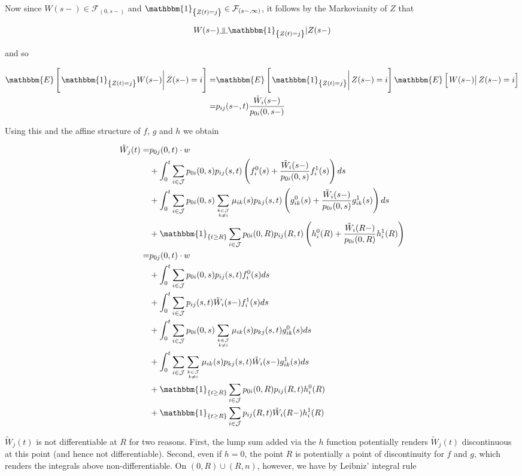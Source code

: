 \documentclass{article}
\newcommand{\indep}{\rotatebox[origin=c]{90}{$\models$}}
\newcommand{\1}[1]{\mathbbm{1}_{\left\lbrace #1 \right\rbrace}}
\newcommand{\econd}[2][def]{\mathbbm{E} \left[ \left. #1 \right| #2 \right]}
\theoremstyle{break}
\theoremstyle{remark}
\numberwithin{equation}{section}
\begin{document}
\begin{appendices}
Now since $W(s-) \in  \mathcal{F}_{\left( 0,s- \right)}$ and $\1{Z(t)=j} \in \mathcal{F}_{\left( s-,\infty \right)}$, it follows by the Markovianity of $Z$ that

\begin{align*}
	W(s-) \indep \1{Z(t)=j} | Z(s-)
\end{align*}

and so

\begin{align*}
	\econd[\1{Z(t)=j}W(s-)]{Z(s-)=i} =& \econd[\1{Z(t)=j}]{Z(s-)=i} \econd[W(s-)]{Z(s-)=i} \\
	=& p_{ij}(s-,t) \frac{\tilde{W}_i(s-)}{p_{0i}(0,s-)}
\end{align*}


Using this and the affine structure of $f$, $g$ and $h$ we obtain

\begin{align}
\tilde{W}_j(t) =& p_{0j}(0,t) \cdot w \\
&+ \int_0^t \sum_{i \in \mathcal{J}} p_{0i}(0,s) p_{ij}(s,t) \left( f_i^0(s) + \frac{\tilde{W}_i(s-)}{p_{0i}(0,s)} f_i^1(s) \right) ds \\
&+ \int_0^t \sum_{i \in \mathcal{J}} p_{0i}(0,s) \sum_{k \in \mathcal{J} \atop k \neq i} \mu_{ik}(s) p_{kj}(s,t) \left( g_{ik}^0(s) + \frac{\tilde{W}_i(s-)}{p_{0i}(0,s)} g_{ik}^1(s) \right) ds \\
&+ \1{t \geq R}\sum_{i \in \mathcal{J}} p_{0i}(0,R) p_{ij}(R,t) \left( h_i^0(R) + \frac{\tilde{W}_i(R-)}{p_{0i}(0,R)} h_i^1(R) \right) \\
=& p_{0j}(0,t) \cdot w \label{FirstLineA} \\
&+ \int_0^t \sum_{i \in \mathcal{J}} p_{0i}(0,s) p_{ij}(s,t) f_i^0(s) ds \\
&+ \int_0^t \sum_{i \in \mathcal{J}} p_{ij}(s,t) \tilde{W}_i(s-) f_i^1(s) ds \\
&+ \int_0^t \sum_{i \in \mathcal{J}} p_{0i}(0,s) \sum_{k \in \mathcal{J} \atop k \neq i} \mu_{ik}(s) p_{kj}(s,t) g_{ik}^0(s) ds \\
&+ \int_0^t \sum_{i \in \mathcal{J}} \sum_{k \in \mathcal{J} \atop k \neq i} \mu_{ik}(s) p_{kj}(s,t) \tilde{W}_i(s-) g_{ik}^1(s) ds \\
&+ \1{t \geq R}\sum_{i \in \mathcal{J}} p_{0i}(0,R) p_{ij}(R,t) h_i^0(R) \label{FirstGlue} \\
&+ \1{t \geq R}\sum_{i \in \mathcal{J}} p_{ij}(R,t) \tilde{W}_i(R-) h_i^1(R) \label{SecondGlue}
\end{align}

$\tilde{W}_j(t)$ is not differentiable at $R$ for two reasons. First, the lump sum added via the $h$ function potentially renders $\tilde{W}_j(t)$ discontinuous at this point (and hence not differentiable). Second, even if $h=0$, the point $R$ is potentially a point of discontinuity for $f$ and $g$, which renders the integrals above non-differentiable. On $(0,R)\cup(R,n)$, however, we have by Leibniz' integral rule


\end{appendices}
\end{document}
